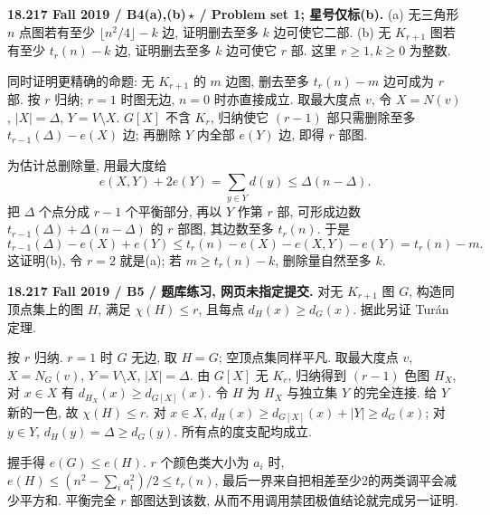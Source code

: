 \begin{exercise}\label{mit:18217-b4}
\textbf{18.217 Fall 2019 / B4(a),(b)\,$\star$ / Problem set 1; 星号仅标(b).}
(a) 无三角形 $n$ 点图若有至少 $\lfloor n^2/4\rfloor-k$ 边, 证明删去至多 $k$ 边可使它二部.
(b) 无 $K_{r+1}$ 图若有至少 $t_r(n)-k$ 边, 证明删去至多 $k$ 边可使它 $r$ 部. 这里 $r\ge1,k\ge0$ 为整数.
\end{exercise}
\begin{solution}
同时证明更精确的命题: 无 $K_{r+1}$ 的 $m$ 边图, 删去至多 $t_r(n)-m$ 边可成为 $r$ 部. 按 $r$ 归纳; $r=1$ 时图无边, $n=0$ 时亦直接成立. 取最大度点 $v$, 令 $X=N(v)$, $|X|=\Delta$, $Y=V\setminus X$. $G[X]$ 不含 $K_r$, 归纳使它 $(r-1)$ 部只需删除至多 $t_{r-1}(\Delta)-e(X)$ 边; 再删除 $Y$ 内全部 $e(Y)$ 边, 即得 $r$ 部图.

为估计总删除量, 用最大度给
\[
e(X,Y)+2e(Y)=\sum_{y\in Y}d(y)\le\Delta(n-\Delta).
\]
把 $\Delta$ 个点分成 $r-1$ 个平衡部分, 再以 $Y$ 作第 $r$ 部, 可形成边数 $t_{r-1}(\Delta)+\Delta(n-\Delta)$ 的 $r$ 部图, 其边数至多 $t_r(n)$. 于是
\[
t_{r-1}(\Delta)-e(X)+e(Y)
\le t_r(n)-e(X)-e(X,Y)-e(Y)=t_r(n)-m.
\]
这证明(b), 令 $r=2$ 就是(a); 若 $m\ge t_r(n)-k$, 删除量自然至多 $k$.
\end{solution}

\begin{exercise}\label{mit:18217-b5}
\textbf{18.217 Fall 2019 / B5 / 题库练习, 网页未指定提交.}
对无 $K_{r+1}$ 图 $G$, 构造同顶点集上的图 $H$, 满足 $\chi(H)\le r$, 且每点 $d_H(x)\ge d_G(x)$. 据此另证 Turán 定理.
\end{exercise}
\begin{solution}
按 $r$ 归纳. $r=1$ 时 $G$ 无边, 取 $H=G$; 空顶点集同样平凡. 取最大度点 $v$, $X=N_G(v)$, $Y=V\setminus X$, $|X|=\Delta$. 由 $G[X]$ 无 $K_r$, 归纳得到 $(r-1)$ 色图 $H_X$, 对 $x\in X$ 有 $d_{H_X}(x)\ge d_{G[X]}(x)$. 令 $H$ 为 $H_X$ 与独立集 $Y$ 的完全连接. 给 $Y$ 新的一色, 故 $\chi(H)\le r$. 对 $x\in X$,
$d_H(x)\ge d_{G[X]}(x)+|Y|\ge d_G(x)$;
对 $y\in Y$, $d_H(y)=\Delta\ge d_G(y)$. 所有点的度支配均成立.

握手得 $e(G)\le e(H)$. $r$ 个颜色类大小为 $a_i$ 时, $e(H)\le(n^2-\sum_i a_i^2)/2\le t_r(n)$, 最后一界来自把相差至少2的两类调平会减少平方和. 平衡完全 $r$ 部图达到该数, 从而不用调用禁团极值结论就完成另一证明.
\end{solution}

